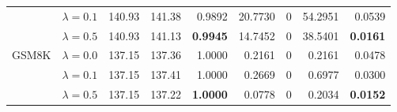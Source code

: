 \begin{table}[t]
{\begin{tabular}{l l rrrrrrr}
 & $\lambda{=}0.1$ & 140.93 & 141.38 & 0.9892 & 20.7730 & \cellcolor{cyan!12} $0$ & 54.2951 & 0.0539 \\
 & $\lambda{=}0.5$ & 140.93 & 141.13 & \textbf{0.9945} & 14.7452 & \cellcolor{cyan!12} $0$ & 38.5401 & \textbf{0.0161} \\
\midrule
GSM8K & $\lambda{=}0.0$ & 137.15 & 137.36 & 1.0000 & 0.2161 & \cellcolor{cyan!12} $0$ & 0.2161 & 0.0478 \\
 & $\lambda{=}0.1$ & 137.15 & 137.41 & 1.0000 & 0.2669 & \cellcolor{cyan!12} $0$ & 0.6977 & 0.0300 \\
 & $\lambda{=}0.5$ & 137.15 & 137.22 & \textbf{1.0000} & 0.0778 & \cellcolor{cyan!12} $0$ & 0.2034 & \textbf{0.0152} \\
\bottomrule
\end{tabular}}
\end{table}